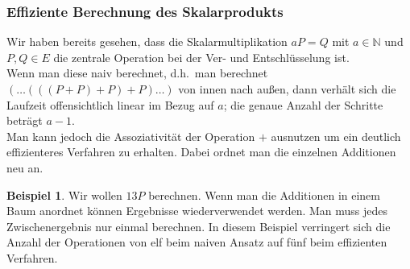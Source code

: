 \documentclass[hidelinks]{article}
\theoremstyle{plain}
\theoremstyle{definition}
\newtheorem{bsp}[thm]{Beispiel}
\theoremstyle{rem}
\begin{document}
\begin{sloppypar}
\subsubsection{Effiziente Berechnung des Skalarprodukts}
Wir haben bereits gesehen, dass die Skalarmultiplikation $aP = Q$ mit $a \in \mathbb{N}$ und $P, Q \in E$ die zentrale Operation bei der Ver- und Entschlüsselung ist. \\
Wenn man diese naiv berechnet, d.h.\ man berechnet $(\dots (((P + P) + P) + P) \dots )$ von innen nach außen, dann verhält sich die Laufzeit offensichtlich linear im Bezug auf $a$; die genaue Anzahl der Schritte beträgt $a-1$. \\
Man kann jedoch die Assoziativität der Operation $+$ ausnutzen um ein deutlich effizienteres Verfahren zu erhalten. Dabei ordnet man die einzelnen Additionen neu an.
\begin{bsp}
    Wir wollen $13P$ berechnen.
    Wenn man die Additionen in einem Baum anordnet können Ergebnisse wiederverwendet werden. Man muss jedes Zwischenergebnis nur einmal berechnen. In diesem Beispiel verringert sich die Anzahl der Operationen von elf beim naiven Ansatz auf fünf beim effizienten Verfahren.
    \begin{figure}[H]
        \centering
\end{figure}
\end{bsp}
\end{sloppypar}
\end{document}
